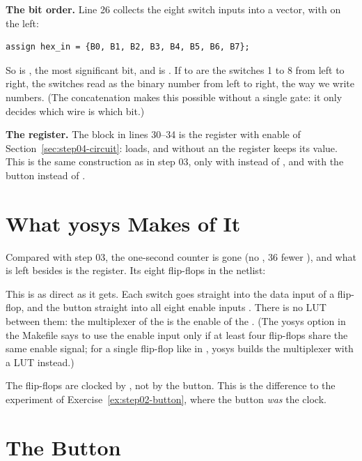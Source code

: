 \textbf{The bit order.} Line 26 collects the eight switch inputs into a
vector, with  on the left:
\begin{lstlisting}
assign hex_in = {B0, B1, B2, B3, B4, B5, B6, B7};
\end{lstlisting}
So  is , the most significant bit, and  is
. If  to  are the switches 1 to 8 from left to
right, the switches read as the binary number from left to right, the way we
write numbers. (The concatenation makes this possible without a single gate:
it only decides which wire is which bit.)

\textbf{The register.} The  block in lines 30--34 is the
register with enable of Section~\ref{sec:step04-circuit}: 
loads, and without an  the register keeps its value. This is the
same construction as  in step 03, only with  instead of
, and with the button instead of .

\section{What yosys Makes of It}
\label{sec:step04-yosys}


Compared with step 03, the one-second counter is gone (no , 36
fewer ), and what is left besides  is the register. Its
eight flip-flops in the netlist:


This is as direct as it gets. Each switch goes straight into the data input
 of a flip-flop, and the button straight into all eight enable inputs
. There is no LUT between them: the multiplexer of the  is the
enable of the . (The yosys option  in the
Makefile says to use the enable input only if at least four flip-flops share
the same enable signal; for a single flip-flop like  in
, yosys builds the multiplexer with a LUT instead.)

The flip-flops are clocked by , not by the button. This is the
difference to the experiment of Exercise~\ref{ex:step02-button}, where the
button \emph{was} the clock.

\section{The Button}
\label{sec:step04-button}

